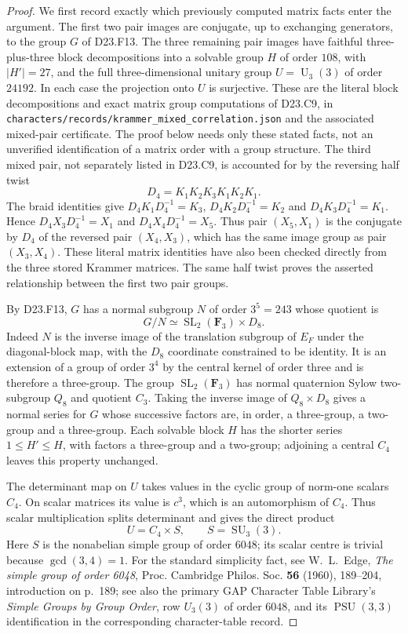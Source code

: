 \begin{proof}
We first record exactly which previously computed matrix
facts enter the argument.  The first two pair images are
conjugate, up to exchanging generators, to the group $G$
of D23.F13.  The three remaining pair images have faithful
three-plus-three block decompositions into a solvable
group $H$ of order $108$, with $|H'|=27$, and the full
three-dimensional unitary group $U=\operatorname U_3(3)$
of order $24192$.  In each case the projection onto $U$
is surjective.  These are the literal block decompositions
and exact matrix group computations of D23.C9, in
\texttt{characters/records/krammer\_mixed\_correlation.json}
and the associated mixed-pair certificate. The proof
below needs only these stated facts, not an unverified
identification of a matrix order with a group structure.
The third mixed pair, not separately listed in D23.C9,
is accounted for by the reversing half twist
\[
 D_4=K_1K_2K_3K_1K_2K_1.
\]
The braid identities give
$D_4K_1D_4^{-1}=K_3$, $D_4K_2D_4^{-1}=K_2$ and
$D_4K_3D_4^{-1}=K_1$. Hence
$D_4X_3D_4^{-1}=X_1$ and
$D_4X_4D_4^{-1}=X_5$. Thus pair $(X_5,X_1)$ is
the conjugate by $D_4$ of the reversed pair $(X_4,X_3)$,
which has the same image group as pair $(X_3,X_4)$.
These literal matrix identities have also been checked
directly from the three stored Krammer matrices.
The same half twist proves the asserted relationship
between the first two pair groups.

By D23.F13, $G$ has a normal subgroup $N$ of order
$3^5=243$ whose quotient is
\[
 G/N\simeq\operatorname{SL}_2(\mathbf F_3)\times D_8.
\]
Indeed $N$ is the inverse image of the translation
subgroup of $E_F$ under the diagonal-block map, with
the $D_8$ coordinate constrained to be identity.
It is an extension of a group of order $3^4$ by the
central kernel of order three and is therefore a
three-group.  The group
$\operatorname{SL}_2(\mathbf F_3)$ has normal quaternion
Sylow two-subgroup $Q_8$ and quotient $C_3$.
Taking the inverse image of $Q_8\times D_8$ gives a
normal series for $G$ whose successive factors are,
in order, a three-group, a two-group and a three-group.
Each solvable block $H$ has the shorter series
$1\leq H'\leq H$, with factors a three-group and a
two-group; adjoining a central $C_4$ leaves this property
unchanged.

The determinant map on $U$ takes values in the cyclic
group of norm-one scalars $C_4$.  On scalar matrices
its value is $c^3$, which is an automorphism of $C_4$.
Thus scalar multiplication splits determinant and gives
the direct product
\[
 U=C_4\times S,\qquad S=\operatorname{SU}_3(3).
\]
Here $S$ is the nonabelian simple group of order $6048$;
its scalar centre is trivial because $\gcd(3,4)=1$.
For the standard simplicity fact, see W.~L.~Edge,
\emph{The simple group of order 6048}, Proc. Cambridge
Philos. Soc. \textbf{56} (1960), 189--204, introduction
on p.~189; see also the primary GAP Character Table
Library's \emph{Simple Groups by Group Order}, row
$U_3(3)$ of order $6048$, and its $\operatorname{PSU}(3,3)$
identification in the corresponding character-table record.


\end{proof}
